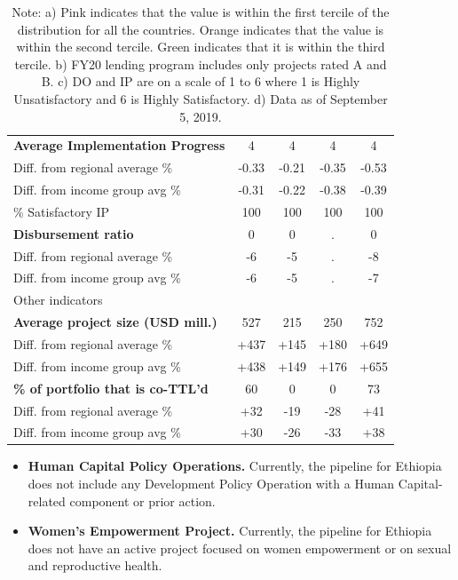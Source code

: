 \documentclass[9.2pt,twocolumn]{article}
\begin{document}
\begin{table}[H]
\begin{tabular}{lcccc}
\textbf{Average Implementation Progress} & \cellcolor{blush} 4 & \cellcolor{blush} 4 & \cellcolor{blush} 4 & \cellcolor{blush} 4 \\ 
Diff. from regional average \% & -0.33 & -0.21 & -0.35 & -0.53 \\ 
Diff. from income group avg \% & -0.31 & -0.22 & -0.38 & -0.39 \\ 
\% Satisfactory IP & 100 & 100 & 100 & 100 \\  \hline
\textbf{Disbursement ratio} & \cellcolor{blush} 0 & \cellcolor{blush} 0 & . & \cellcolor{blush} 0 \\ 
Diff. from regional average \% & -6 & -5 & . & -8 \\ 
Diff. from income group avg \% & -6 & -5 & . & -7 \\ \hline
\cellcolor{iceberg}Other indicators & \cellcolor{iceberg} & \cellcolor{iceberg} & \cellcolor{iceberg} & \cellcolor{iceberg} \\ \hline
\textbf{Average project size (USD mill.)} & \cellcolor{asparagus} 527 & \cellcolor{asparagus} 215 & \cellcolor{asparagus} 250 & \cellcolor{asparagus} 752 \\ 
Diff. from regional average \% & +437 & +145 & +180 & +649 \\ 
Diff. from income group avg \% & +438 & +149 & +176 & +655 \\  \hline
\textbf{\% of portfolio that is co-TTL'd} & \cellcolor{asparagus} 60 & \cellcolor{blush} 0 & \cellcolor{blush} 0 & \cellcolor{asparagus} 73 \\ 
Diff. from regional average \% & +32 & -19 & -28 & +41 \\ 
Diff. from income group avg \% & +30 & -26 & -33 & +38 \\ \hline
\end{tabular}
\caption*{Note: a) \colorbox{blush}{Pink} indicates that the value is within the first tercile of the distribution for all the countries. \colorbox{arylideyellow}{Orange} indicates that the value is within the second tercile. \colorbox{asparagus}{Green} indicates that it is within the third tercile. b) FY20 lending program includes only projects rated A and B. c) DO and IP are on a scale of 1 to 6 where 1 is Highly Unsatisfactory and 6 is Highly Satisfactory. d) Data as of September 5, 2019.}
\end{table}

\begin{itemize}
\item
  \textbf{Human Capital Policy Operations.} Currently, the pipeline for
  Ethiopia does not include any Development Policy Operation with a
  Human Capital-related component or prior action.
\item
  \textbf{Women's Empowerment Project.} Currently, the pipeline for
  Ethiopia does not have an active project focused on women empowerment
  or on sexual and reproductive health.
\end{itemize}
\end{document}
